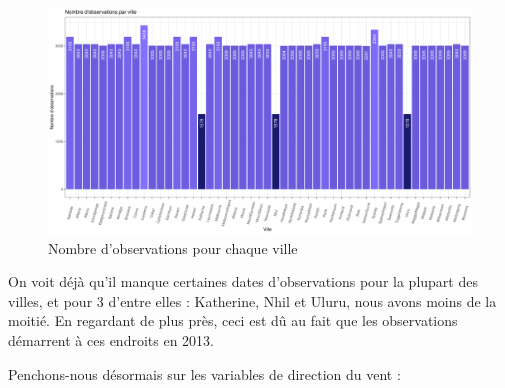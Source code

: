 \documentclass{article}
\begin{document}
\begin{figure}[H]
    \centering
    \includegraphics[width=\textwidth]{Images/hist_observations_cities.pdf}
    \caption{Nombre d'observations pour chaque ville}
\end{figure}

On voit déjà qu'il manque certaines dates d'observations pour la plupart des villes, et pour 3 d'entre elles : Katherine, Nhil et Uluru, nous avons moins de la moitié. En regardant de plus près, ceci est dû au fait que les observations démarrent à ces endroits en 2013.

Penchons-nous désormais sur les variables de direction du vent : 

\begin{table}[H]
    \centering
    \caption{Variable WindGustDir}
\end{table}

\begin{table}[H]
    \centering
    \caption{Variable WindDir9am}
\end{table}
 
\end{document}
